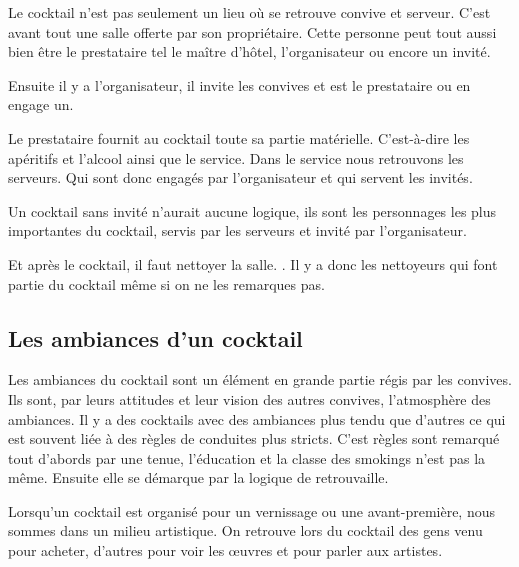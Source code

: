 
Le cocktail n’est pas seulement un lieu où se retrouve convive et serveur. C’est avant tout une salle offerte par son propriétaire. Cette personne peut tout aussi bien être le prestataire tel le maître d’hôtel, l’organisateur ou encore un invité.

Ensuite il y a l’organisateur, il invite les convives et est le prestataire ou en engage un.

Le prestataire fournit au cocktail toute sa partie matérielle. C’est-à-dire les apéritifs et l’alcool ainsi que le service. Dans le service nous retrouvons les serveurs. Qui sont donc engagés par l’organisateur et qui servent les invités.

Un cocktail sans invité n’aurait aucune logique, ils sont les personnages les plus importantes du cocktail, servis par les serveurs et invité par l’organisateur.

Et après le cocktail, il faut nettoyer la salle. . Il y a donc les nettoyeurs qui font partie du cocktail même si on ne les remarques pas.

\subsection{Les ambiances d'un cocktail}




Les ambiances du cocktail sont un élément en grande partie régis par les convives. Ils sont, par leurs attitudes et leur vision des autres convives, l’atmosphère des ambiances. 
Il y a des cocktails avec des ambiances plus tendu que d’autres ce qui est souvent liée à des règles de conduites plus stricts. C’est règles sont remarqué tout d’abords par une tenue, l’éducation et la classe des smokings n’est pas la même.  Ensuite elle se démarque par la logique de retrouvaille. 

Lorsqu’un cocktail est organisé pour un vernissage ou une avant-première, nous sommes dans un milieu artistique. On retrouve lors du cocktail des gens venu pour acheter, d’autres pour voir les œuvres et pour parler aux artistes.

